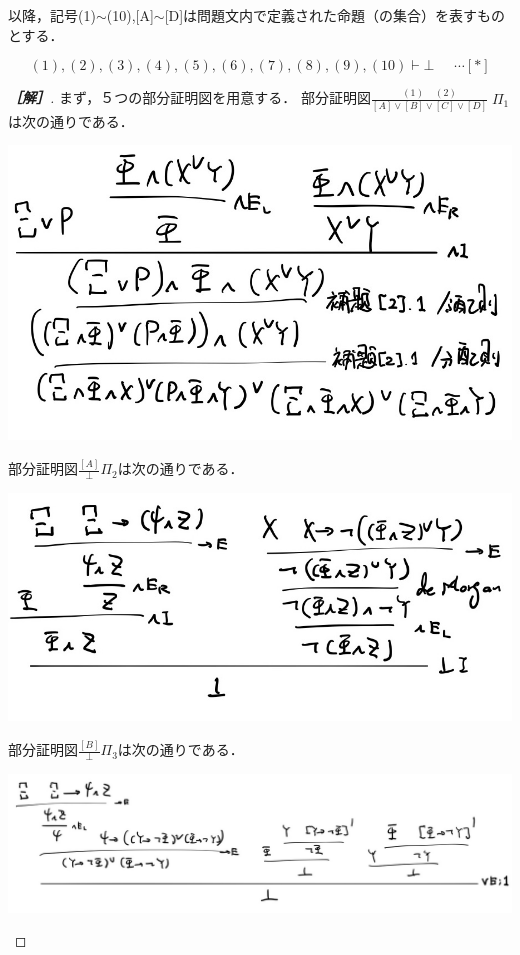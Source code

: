 \documentclass[uplatex,dvipdfmx]{jsarticle}
\begin{document}
以降，記号(1)$\sim$(10),[A]$\sim$[D]は問題文内で定義された命題（の集合）を表すものとする．
\begin{problem}
    \[ (1),(2),(3),(4),(5),(6),(7),(8),(9),(10)\vdash\bot\;\;\;\;\;\cdots[*] \]
\end{problem}
\begin{proof}[\bf{［解］}]
    まず，５つの部分証明図を用意する．
    部分証明図$\frac{(1)\;\;\;\;(2)}{[A]\lor[B]\lor[C]\lor[D]}\;\Pi_1$は次の通りである．
    \begin{center}
        \includegraphics[width=15cm]{figure7.jpg}
    \end{center}
    部分証明図$\frac{[A]}{\bot}\Pi_2$は次の通りである．
    \begin{center}
        \includegraphics[width=15cm]{figure8.jpg}
    \end{center}
    部分証明図$\frac{[B]}{\bot}\Pi_3$は次の通りである．
    \begin{center}
        \includegraphics[width=15cm]{figure9.jpg}

\end{center}
\end{proof}
\end{document}
